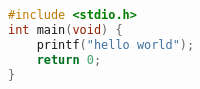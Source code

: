 \begin{appendix}
\begin{lstlisting}[language=C]
#include <stdio.h>
int main(void) {
    printf("hello world");
    return 0;
}
\end{lstlisting}
\end{appendix}